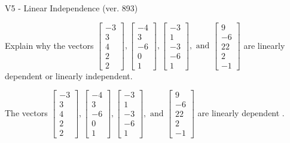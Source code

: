 \begin{exercise}
  \begin{exerciseTitle}V5 - Linear Independence (ver. 893)\end{exerciseTitle}
  \begin{exerciseStatement}
    Explain why the vectors \(\left[\begin{array}{r}
-3 \\
3 \\
4 \\
2 \\
2
\end{array}\right] , \left[\begin{array}{r}
-4 \\
3 \\
-6 \\
0 \\
1
\end{array}\right] , \left[\begin{array}{r}
-3 \\
1 \\
-3 \\
-6 \\
1
\end{array}\right] , \text{ and } \left[\begin{array}{r}
9 \\
-6 \\
22 \\
2 \\
-1
\end{array}\right]\) are linearly dependent or linearly independent.	


  \end{exerciseStatement}
  \begin{exerciseAnswer}
   The vectors \(\left[\begin{array}{r}
-3 \\
3 \\
4 \\
2 \\
2
\end{array}\right] , \left[\begin{array}{r}
-4 \\
3 \\
-6 \\
0 \\
1
\end{array}\right] , \left[\begin{array}{r}
-3 \\
1 \\
-3 \\
-6 \\
1
\end{array}\right] , \text{ and } \left[\begin{array}{r}
9 \\
-6 \\
22 \\
2 \\
-1
\end{array}\right]\) are 
  	 linearly dependent  .
  


  \end{exerciseAnswer}
\end{exercise}